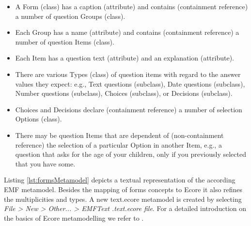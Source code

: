 		\begin{itemize} 
		  \item A Form (class) has a caption (attribute) and contains (containment
		  reference) a number of question Groups (class).
		  \item Each Group has a name (attribute) and contains (containment reference)
		  a number of question Items (class).
		  \item Each Item has a question text (attribute) and an explanation
		  (attribute).
		  \item There are various Types (class) of question items  with
		  regard to the answer values they expect: e.g., Text questions
		  (subclass), Date questions  (subclass), Number questions  (subclass),
		  Choices (subclass), or Decisions (subclass).
		  \item Choices and Decisions declare (containment reference) a number of
		  selection Options (class).
		  \item There may be question Items
		  that are dependent of (non-containment reference) the selection of a 
		  particular Option in another Item, 
		  e.g., a question that asks for the age of your children, only if you
		  previously selected that you have some.
		\end{itemize}

	Listing \ref{lst:formsMetamodel} depicts a textual representation of the
	according EMF metamodel. Besides the mapping of forms concepts to Ecore it
	also refines the multiplicities and types. A new text.ecore metamodel is
	created by selecting \emph{File > New > Other... > EMFText .text.ecore
	file}. For a detailed introduction on the basics of Ecore metamodelling we
	refer to \cite{EMF}.

